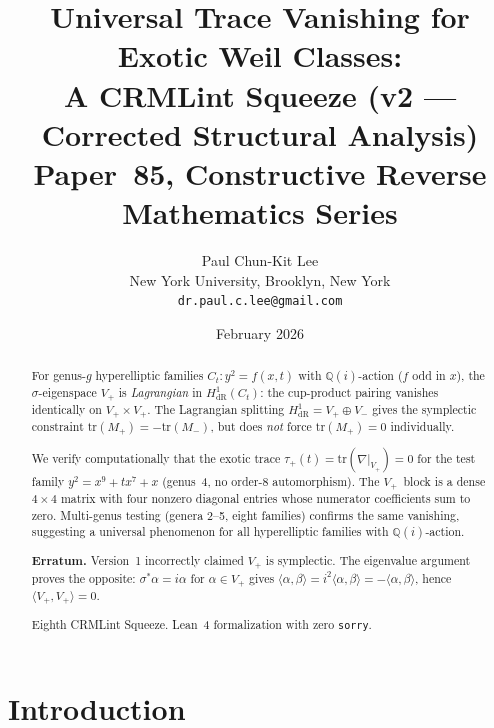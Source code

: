 \documentclass[11pt]{article}
\theoremstyle{plain}
\theoremstyle{definition}
\theoremstyle{remark}
\newcommand{\Q}{\mathbb{Q}}
\newcommand{\tr}{\mathrm{tr}}
\newcommand{\HdR}{H^1_{\mathrm{dR}}}
\begin{document}
\title{Universal Trace Vanishing for Exotic Weil Classes:\\
A CRMLint Squeeze (v2 --- Corrected Structural Analysis)\\[6pt]
\large Paper~85, Constructive Reverse Mathematics Series}

\author{Paul Chun-Kit Lee\\
\small New York University, Brooklyn, New York\\
\small \texttt{dr.paul.c.lee@gmail.com}}

\date{February 2026}

\maketitle

\begin{abstract}
For genus-$g$ hyperelliptic families $C_t\colon y^2 = f(x,t)$ with
$\Q(i)$-action ($f$ odd in $x$), the $\sigma$-eigenspace $V_+$ is
\emph{Lagrangian} in $\HdR(C_t)$: the cup-product pairing vanishes
identically on $V_+ \times V_+$.  The Lagrangian splitting
$\HdR = V_+ \oplus V_-$ gives the symplectic constraint
$\tr(M_+) = -\tr(M_-)$, but does \emph{not} force $\tr(M_+) = 0$
individually.

We verify computationally that the exotic trace
$\tau_+(t) = \tr(\nabla|_{V_+}) = 0$ for the test family
$y^2 = x^9 + tx^7 + x$ (genus~4, no order-8 automorphism).
The $V_+$~block is a dense $4 \times 4$ matrix with four nonzero
diagonal entries whose numerator coefficients sum to zero.
Multi-genus testing (genera 2--5, eight families) confirms the
same vanishing, suggesting a universal phenomenon for all
hyperelliptic families with $\Q(i)$-action.

\textbf{Erratum.} Version~1 incorrectly claimed $V_+$ is
symplectic. The eigenvalue argument proves the opposite:
$\sigma^*\alpha = i\alpha$ for $\alpha \in V_+$ gives
$\langle\alpha,\beta\rangle = i^2\langle\alpha,\beta\rangle =
-\langle\alpha,\beta\rangle$, hence $\langle V_+, V_+\rangle = 0$.

Eighth CRMLint Squeeze. Lean~4 formalization with zero \texttt{sorry}.
\end{abstract}

\section{Introduction}
\end{document}
